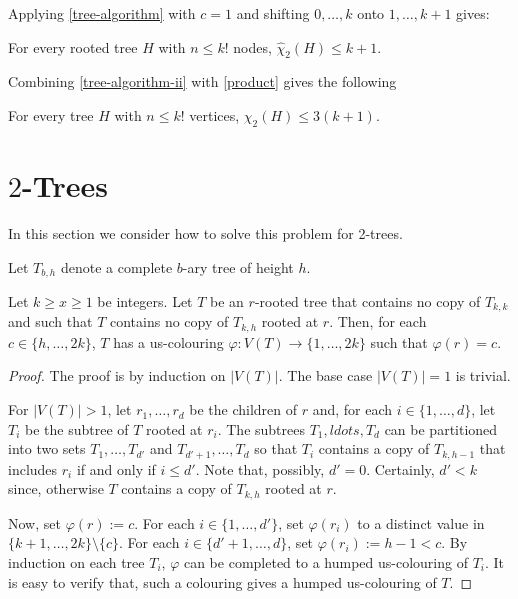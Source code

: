 \documentclass[kpfonts]{patmorin}
\newcommand{\uqs}{\chi_2}
\newcommand{\hus}{\hat{\chi}_2}
\begin{document}
Applying \cref{tree-algorithm} with $c=1$ and shifting $0,\ldots,k$ onto $1,\ldots,k+1$ gives:

\begin{cor}\label{tree-algorithm-ii}
    For every rooted tree $H$ with $n\le k!$ nodes, $\hus(H)\le k+1$.
\end{cor}

Combining \cref{tree-algorithm-ii} with \cref{product} gives the following
\begin{thm}
    For every tree $H$ with $n\le k!$ vertices, $\uqs(H)\le 3(k+1)$.
\end{thm}


\section{$2$-Trees}

In this section we consider how to solve this problem for 2-trees.

Let $T_{b,h}$ denote a complete $b$-ary tree of height $h$.

\begin{lem}
    Let $k\ge x\ge 1$ be integers.
    Let $T$ be an $r$-rooted tree that contains no copy of $T_{k,k}$ and such that $T$ contains no copy of $T_{k,h}$ rooted at $r$.  Then, for each $c\in\{h,\ldots,2k\}$, $T$ has a us-colouring $\varphi:V(T)\to \{1,\ldots,2k\}$ such that $\varphi(r)=c$.
\end{lem}

\begin{proof}
    The proof is by induction on $|V(T)|$.  The base case $|V(T)|=1$ is trivial.

    For $|V(T)|>1$, let $r_1,\ldots,r_d$ be the children of $r$ and, for each $i\in\{1,\ldots,d\}$, let $T_i$ be the subtree of $T$ rooted at $r_i$.  The subtrees $T_1,ldots,T_d$ can be partitioned into two sets $T_1,\ldots,T_{d'}$ and $T_{d'+1},\ldots,T_d$ so that $T_i$ contains a copy of $T_{k,h-1}$ that includes $r_i$ if and only if $i\le d'$.  Note that, possibly, $d'=0$.   Certainly, $d' < k$ since, otherwise $T$ contains a copy of $T_{k,h}$ rooted at $r$.

    Now, set $\varphi(r):=c$. For each $i\in\{1,\ldots,d'\}$, set $\varphi(r_i)$ to a distinct value in $\{k+1,\ldots,2k\}\setminus \{c\}$. For each $i\in\{d'+1,\ldots,d\}$, set $\varphi(r_i):=h-1 < c$.  By induction on each tree $T_i$, $\varphi$ can be completed to a humped us-colouring of $T_i$.  It is easy to verify that, such a colouring gives a humped us-colouring of $T$.
\end{proof}
\end{document}
